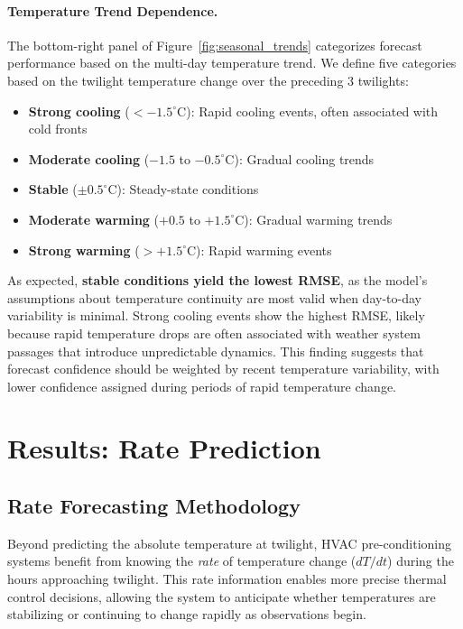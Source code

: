 \documentclass[11pt]{article}
\begin{document}
\paragraph{Temperature Trend Dependence.}
The bottom-right panel of Figure~\ref{fig:seasonal_trends} categorizes forecast performance based on the multi-day temperature trend. We define five categories based on the twilight temperature change over the preceding 3 twilights:
\begin{itemize}
    \item \textbf{Strong cooling} ($<-1.5^\circ$C): Rapid cooling events, often associated with cold fronts
    \item \textbf{Moderate cooling} ($-1.5$ to $-0.5^\circ$C): Gradual cooling trends
    \item \textbf{Stable} ($\pm 0.5^\circ$C): Steady-state conditions
    \item \textbf{Moderate warming} ($+0.5$ to $+1.5^\circ$C): Gradual warming trends
    \item \textbf{Strong warming} ($>+1.5^\circ$C): Rapid warming events
\end{itemize}

As expected, \textbf{stable conditions yield the lowest RMSE}, as the model's assumptions about temperature continuity are most valid when day-to-day variability is minimal. Strong cooling events show the highest RMSE, likely because rapid temperature drops are often associated with weather system passages that introduce unpredictable dynamics. This finding suggests that forecast confidence should be weighted by recent temperature variability, with lower confidence assigned during periods of rapid temperature change.

\section{Results: Rate Prediction}

\subsection{Rate Forecasting Methodology}

Beyond predicting the absolute temperature at twilight, HVAC pre-conditioning systems benefit from knowing the \emph{rate} of temperature change ($dT/dt$) during the hours approaching twilight. This rate information enables more precise thermal control decisions, allowing the system to anticipate whether temperatures are stabilizing or continuing to change rapidly as observations begin.
\end{document}
